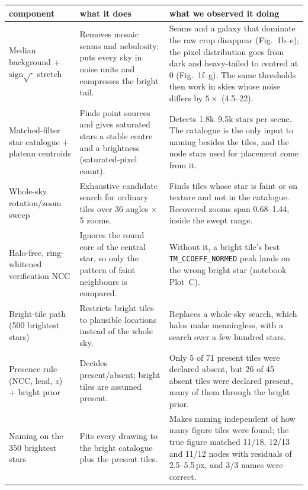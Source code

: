\documentclass[a4paper,11pt]{article}
\begin{document}
\begin{table}[h]
\centering\small
\begin{tabular}{p{3.3cm}p{5.6cm}p{6.6cm}}
\toprule
component & what it does & what we observed it doing \\
\midrule
Median background + $\mathrm{sign}\sqrt{\cdot}$ stretch &
Removes mosaic seams and nebulosity; puts every sky in noise units and compresses the bright tail. &
Seams and a galaxy that dominate the raw crop disappear (Fig.~1b--e); the pixel distribution goes from dark and
heavy-tailed to centred at 0 (Fig.~1f--g). The same thresholds then work in skies whose noise differs by $5\times$ (4.5--22). \\
\addlinespace
Matched-filter star catalogue + plateau centroids &
Finds point sources and gives saturated stars a stable centre and a brightness (saturated-pixel count). &
Detects 1.8k--9.5k stars per scene. The catalogue is the only input to naming besides the tiles, and the node stars
used for placement come from it. \\
\addlinespace
Whole-sky rotation/zoom sweep &
Exhaustive candidate search for ordinary tiles over 36 angles $\times$ 5 zooms. &
Finds tiles whose star is faint or on texture and not in the catalogue. Recovered zooms span 0.68--1.44, inside the
swept range. \\
\addlinespace
Halo-free, ring-whitened verification NCC &
Ignores the round core of the central star, so only the pattern of faint neighbours is compared. &
Without it, a bright tile's best \texttt{TM\_CCOEFF\_NORMED} peak lands on the wrong bright star (notebook Plot~C). \\
\addlinespace
Bright-tile path (500 brightest stars) &
Restricts bright tiles to plausible locations instead of the whole sky. &
Replaces a whole-sky search, which halos make meaningless, with a search over a few hundred stars. \\
\addlinespace
Presence rule (NCC, lead, $z$) + bright prior &
Decides present/absent; bright tiles are assumed present. &
Only 5 of 71 present tiles were declared absent, but 26 of 45 absent tiles were declared present, many of them
through the bright prior. \\
\addlinespace
Naming on the 350 brightest stars &
Fits every drawing to the bright catalogue plus the present tiles. &
Makes naming independent of how many figure tiles were found; the true figure matched 11/18, 12/13 and 11/12 nodes
with residuals of 2.5--5.5\,px, and 3/3 names were correct. \\

\end{tabular}
\end{table}
\end{document}
